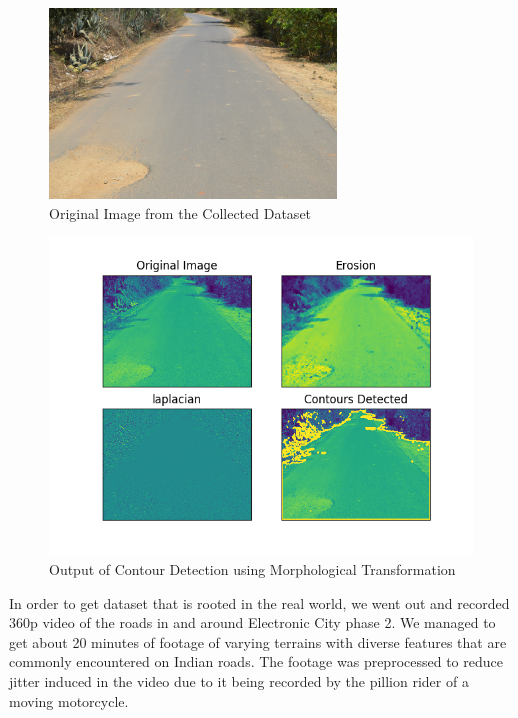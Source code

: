 \documentclass[12pt,a4paper]{article}
\begin{document}
\begin{itemize}
    \begin{figure}[ht!]
        \centering
        \includegraphics[width = 3in]{images/road_cam_31.jpg}
        \caption{Original Image from the Collected Dataset}
    \end{figure}

    \begin{figure}[ht!]
        \centering
        \includegraphics[width = 5in]{images/morph_transform_7.png}
        \caption{Output of Contour Detection using Morphological Transformation}
    \end{figure}
    \pagebreak
    
\end{itemize}

\vspace*{.5cm}



\newpage


In order to get dataset that is rooted in the real world, we went out and recorded 360p video of the roads in and around Electronic City phase 2. We managed to get about 20 minutes of footage of varying terrains with diverse features that are commonly encountered on Indian roads. The footage was preprocessed to reduce jitter induced in the video due to it being recorded by the pillion rider of a moving motorcycle. 
\end{document}
